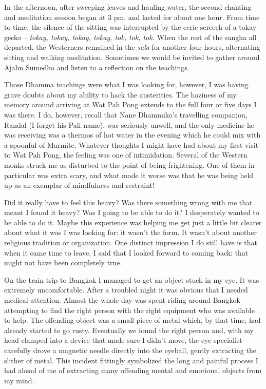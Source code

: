 In the afternoon, after sweeping leaves and hauling water, the second
chanting and meditation session began at 3 pm, and lasted for about one
hour. From time to time, the silence of the sitting was interrupted by
the eerie screech of a tokay gecko\cite{gecko} --
\emph{tokay, tokay, tokay, tokay, tok, tok, tok.}
When the rest of the sangha all departed, the
Westerners remained in the \emph{sala} for another four hours,
alternating sitting and walking meditation. Sometimes we would be
invited to gather around Ajahn Sumedho and listen to a reflection on the
teachings.

Those Dhamma teachings were what I was looking for, however, I was
having grave doubts about my ability to hack the austerities. The
haziness of my memory around arriving at Wat Pah Pong extends to the
full four or five days I was there. I do, however, recall that Nane
Dhammiko's travelling companion, Randal (I forget his Pali name), was
seriously unwell, and the only medicine he was receiving was a thermos
of hot water in the evening which he could mix with a spoonful of
Marmite. Whatever thoughts I might have had about my first visit to Wat
Pah Pong, the feeling was one of intimidation. Several of the Western
monks struck me as disturbed to the point of being frightening. One of
them in particular was extra scary, and what made it worse was that he
was being held up as an exemplar of mindfulness and restraint!

Did it really have to feel this heavy? Was there something wrong with me
that meant I found it heavy? Was I going to be able to do it? I
desperately wanted to be able to do it. Maybe this experience was
helping me get just a little bit clearer about what it was I was looking
for: it wasn't the form. It wasn't about another religious tradition or
organization. One distinct impression I do still have is that when it
came time to leave, I said that I looked forward to coming back: that
might not have been completely true.

On the train trip to Bangkok I managed to get an object stuck in my eye.
It was extremely uncomfortable. After a troubled night it was obvious
that I needed medical attention. Almost the whole day was spent riding
around Bangkok attempting to find the right person with the right
equipment who was available to help. The offending object was a small
piece of metal which, by that time, had already started to go rusty.
Eventually we found the right person and, with my head clamped into a
device that made sure I didn't move, the eye specialist carefully drove
a magnetic needle directly into the eyeball, gently extracting the
slither of metal. This incident fittingly symbolized the long and
painful process I had ahead of me of extracting many offending mental
and emotional objects from my mind.

